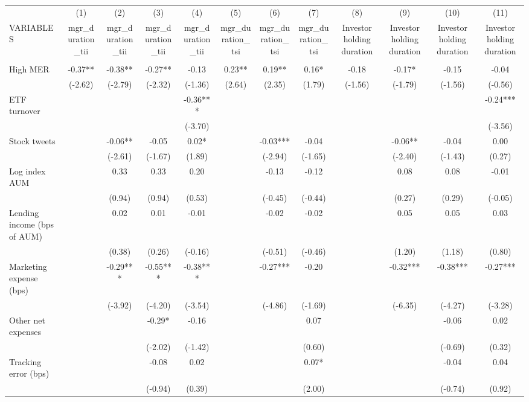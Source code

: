 \documentclass[]{article}
\begin{document}
\begin{tabular}{lccccccccccc} \hline
 & (1) & (2) & (3) & (4) & (5) & (6) & (7) & (8) & (9) & (10) & (11) \\
VARIABLES & mgr\_duration\_tii & mgr\_duration\_tii & mgr\_duration\_tii & mgr\_duration\_tii & mgr\_duration\_tsi & mgr\_duration\_tsi & mgr\_duration\_tsi & Investor holding duration & Investor holding duration & Investor holding duration & Investor holding duration \\ \hline
 &  &  &  &  &  &  &  &  &  &  &  \\
High MER & -0.37** & -0.38** & -0.27** & -0.13 & 0.23** & 0.19** & 0.16* & -0.18 & -0.17* & -0.15 & -0.04 \\
 & (-2.62) & (-2.79) & (-2.32) & (-1.36) & (2.64) & (2.35) & (1.79) & (-1.56) & (-1.79) & (-1.56) & (-0.56) \\
ETF turnover &  &  &  & -0.36*** &  &  &  &  &  &  & -0.24*** \\
 &  &  &  & (-3.70) &  &  &  &  &  &  & (-3.56) \\
Stock tweets &  & -0.06** & -0.05 & 0.02* &  & -0.03*** & -0.04 &  & -0.06** & -0.04 & 0.00 \\
 &  & (-2.61) & (-1.67) & (1.89) &  & (-2.94) & (-1.65) &  & (-2.40) & (-1.43) & (0.27) \\
Log index AUM &  & 0.33 & 0.33 & 0.20 &  & -0.13 & -0.12 &  & 0.08 & 0.08 & -0.01 \\
 &  & (0.94) & (0.94) & (0.53) &  & (-0.45) & (-0.44) &  & (0.27) & (0.29) & (-0.05) \\
Lending income (bps of AUM) &  & 0.02 & 0.01 & -0.01 &  & -0.02 & -0.02 &  & 0.05 & 0.05 & 0.03 \\
 &  & (0.38) & (0.26) & (-0.16) &  & (-0.51) & (-0.46) &  & (1.20) & (1.18) & (0.80) \\
Marketing expense (bps) &  & -0.29*** & -0.55*** & -0.38*** &  & -0.27*** & -0.20 &  & -0.32*** & -0.38*** & -0.27*** \\
 &  & (-3.92) & (-4.20) & (-3.54) &  & (-4.86) & (-1.69) &  & (-6.35) & (-4.27) & (-3.28) \\
Other net expenses &  &  & -0.29* & -0.16 &  &  & 0.07 &  &  & -0.06 & 0.02 \\
 &  &  & (-2.02) & (-1.42) &  &  & (0.60) &  &  & (-0.69) & (0.32) \\
Tracking error (bps) &  &  & -0.08 & 0.02 &  &  & 0.07* &  &  & -0.04 & 0.04 \\
 &  &  & (-0.94) & (0.39) &  &  & (2.00) &  &  & (-0.74) & (0.92) \\

\end{tabular}
\end{document}
